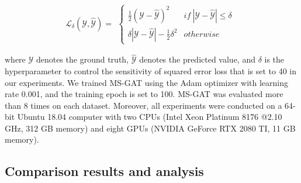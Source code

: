 \begin{equation}
    \label{eqn:huber_loss}
    \mathcal{L}_{\delta}(\mathcal{Y}, \hat{\mathcal{Y}}) =
    \begin{aligned}
        \begin{cases}
            \frac{1}{2} \left ( \mathcal{Y} - \hat{\mathcal{Y}} \right ) ^2                 & if \ \left | \mathcal{Y} - \hat{\mathcal{Y}} \right | \leq \delta \\
            \delta \left | \mathcal{Y} - \hat{\mathcal{Y}} \right | - \frac{1}{2} \delta ^2 & otherwise
        \end{cases}
    \end{aligned}
\end{equation}

where $\mathcal{Y}$ denotes the ground truth, $\hat{\mathcal{Y}}$ denotes the predicted value, and $\delta$ is the hyperparameter to control the sensitivity of squared error loss that is set to 40 in our experiments. We trained MS-GAT using the Adam optimizer with learning rate 0.001, and the training epoch is set to 100. MS-GAT was evaluated more than 8 times on each dataset. Moreover, all experiments were conducted on a 64-bit Ubuntu 18.04 computer with two CPUs (Intel Xeon Platinum 8176 @2.10 GHz, 312 GB memory) and eight GPUs (NVIDIA GeForce RTX 2080 TI, 11 GB memory).

\subsection{Comparison results and analysis}

